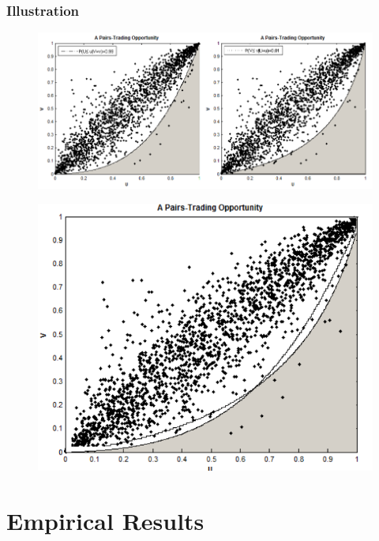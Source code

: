\documentclass[pdf,9pt,xcolor=dvipsnames,hide notes]{beamer}
\begin{document}
	\begin{frame}
\frametitle{Illustration}

\begin{figure}[htbp]
	\centering
	\includegraphics[scale=0.33]{trading_opt.png}
	\label{fig:trad_opt}
\end{figure}

\begin{figure}[htbp]
	\centering
	\includegraphics[scale=0.33]{trading_opt2.png}
	\label{fig:trad_opt2}
\end{figure}

\end{frame}



\section{Empirical Results}
\end{document}

